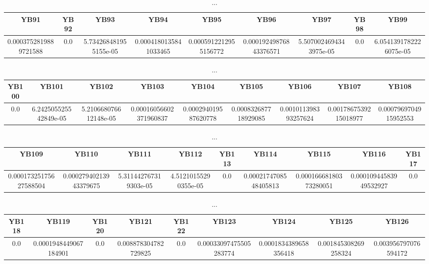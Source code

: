 \documentclass[]{article}
\begin{document}
\begin{table}[h]
      \centering
      \begin{tabular}{|c|c|c|c|c|c|c|c|c|}
            \hline
            YB91                  & YB92 & YB93                  & YB94                  & YB95                  & YB96                   & YB97                   & YB98 & YB99                   \\
            \hline
            0.0003752819889721588 & 0.0  & 5.734268481955155e-05 & 0.0004180135841033465 & 0.0005912212955156772 & 0.00019249876843376571 & 5.5070024694343975e-05 & 0.0  & 6.0541391782226075e-05 \\
            \hline
      \end{tabular}
      \caption{...}
\end{table}
\begin{table}[h]
      \centering
      \begin{tabular}{|c|c|c|c|c|c|c|c|c|}
            \hline
            YB100 & YB101                 & YB102                 & YB103                  & YB104                & YB105                & YB106                & YB107                 & YB108                 \\
            \hline
            0.0   & 6.242505525542849e-05 & 5.210668076612148e-05 & 0.00016056602371960837 & 0.000294019587620778 & 0.000832687718929085 & 0.001011398393257624 & 0.0017867539215018977 & 0.0007969704915952553 \\
            \hline
      \end{tabular}
      \caption{...}
\end{table}
\begin{table}[h]
      \centering
      \begin{tabular}{|c|c|c|c|c|c|c|c|c|}
            \hline
            YB109                  & YB110                  & YB111                 & YB112                & YB113 & YB114                 & YB115                  & YB116                  & YB117 \\
            \hline
            0.00017325175627588504 & 0.00027940213943379675 & 5.311442767319303e-05 & 4.51210155290355e-05 & 0.0   & 0.0002174708548405813 & 0.00016668180373280051 & 0.00010944583949532927 & 0.0   \\
            \hline
      \end{tabular}
      \caption{...}
\end{table}
\begin{table}[h]
      \centering
      \begin{tabular}{|c|c|c|c|c|c|c|c|c|}
            \hline
            YB118 & YB119                 & YB120 & YB121                & YB122 & YB123                  & YB124                 & YB125                & YB126                \\
            \hline
            0.0   & 0.0001948449067184901 & 0.0   & 0.008878304782729825 & 0.0   & 0.00033097475505283774 & 0.0001834389658356418 & 0.001845308269258324 & 0.003956797076594172 \\
            \hline
      \end{tabular}
      \caption{...}
\end{table}
\end{document}
